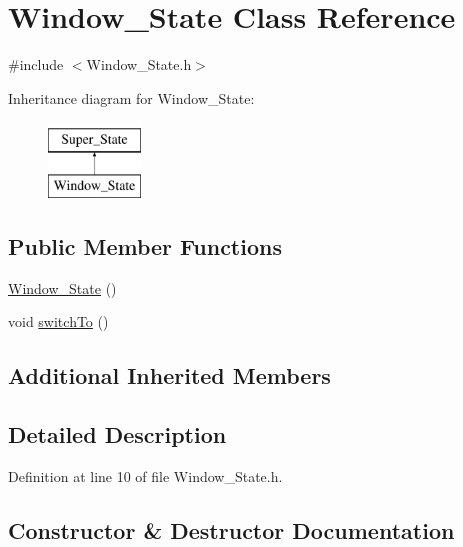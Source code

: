 \hypertarget{class_window___state}{}\section{Window\+\_\+\+State Class Reference}
\label{class_window___state}


{\ttfamily \#include $<$Window\+\_\+\+State.\+h$>$}

Inheritance diagram for Window\+\_\+\+State\+:\begin{figure}[H]
\begin{center}
\leavevmode
\includegraphics[height=2.000000cm]{class_window___state}
\end{center}
\end{figure}
\subsection*{Public Member Functions}
\begin{DoxyCompactItemize}
\item 
\hyperlink{class_window___state_ab4d8eb3df145797fae3d0fefcaca2576}{Window\+\_\+\+State} ()
\item 
void \hyperlink{class_window___state_af1b365ecb6b56f60c9f389abc4ad1a1b}{switch\+To} ()
\end{DoxyCompactItemize}
\subsection*{Additional Inherited Members}


\subsection{Detailed Description}


Definition at line 10 of file Window\+\_\+\+State.\+h.



\subsection{Constructor \& Destructor Documentation}
\hypertarget{class_window___state_ab4d8eb3df145797fae3d0fefcaca2576}{}\label{class_window___state_ab4d8eb3df145797fae3d0fefcaca2576} 
